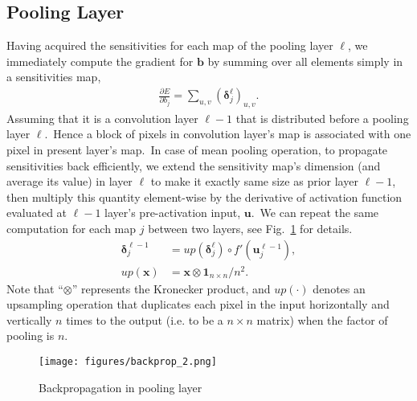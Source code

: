 \subsection{Pooling Layer}
Having acquired the sensitivities for each map of the pooling layer $\ell$, we immediately compute the gradient for $\bm{b}$ by summing over all elements simply in a sensitivities map,
\begin{align}
	\frac{\partial E}{\partial b_j} = \sum_{u,v} (\bm{\delta}_j^\ell)_{u,v}.
\end{align}
Assuming that it is a convolution layer $\ell-1$ that is distributed before a pooling layer $\ell$.~Hence a block of pixels in convolution layer's map is associated with one pixel in present layer's map.~In case of mean pooling operation, to propagate sensitivities back efficiently, we extend the sensitivity map's dimension (and average its value) in layer $\ell$ to make it exactly same size as prior layer $\ell-1$, then multiply this quantity element-wise by the derivative of activation function evaluated at $\ell-1$ layer's pre-activation input, $\bm{u}$.~We can repeat the same computation for each map $j$ between two layers, see Fig.~\ref{fig:delta_pooling} for details.
\begin{align}
	\bm{\delta}_j^{\ell-1} &= up(\bm{\delta}_j^\ell) \circ f'(\bm{u}_j^{\ell-1}), \\
	up(\bm{x}) &= \bm{x} \otimes \bm{1}_{n \times n} / n^2.
\end{align}
Note that ``$\otimes$'' represents the Kronecker product, and $up(\cdot)$ denotes an upsampling operation that duplicates each pixel in the input horizontally and vertically $n$ times to the output (i.e. to be a $n \times n$ matrix) when the factor of pooling is $n$.
\begin{figure}[htbp]
	\centering
	\texttt{[image: figures/backprop\_2.png]}
	\caption{Backpropagation in pooling layer} \label{fig:delta_pooling}
\end{figure}

